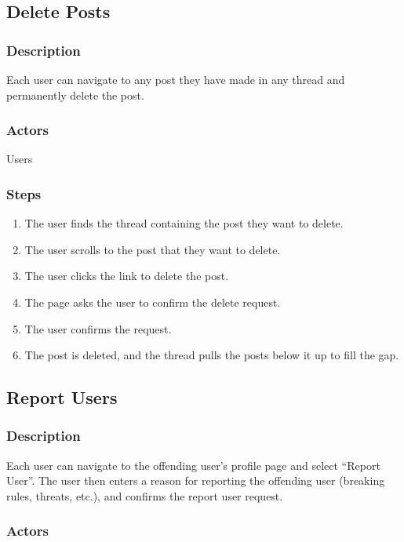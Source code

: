 \documentclass[12pt]{scrartcl}
\begin{document}
\subsection{Delete Posts}
\subsubsection{Description}

Each user can navigate to any post they have made in any thread and permanently delete the post.

\subsubsection{Actors}

Users

\subsubsection{Steps}

\begin{enumerate}
\item The user finds the thread containing the post they want to delete.
\item The user scrolls to the post that they want to delete.
\item The user clicks the link to delete the post.
\item The page asks the user to confirm the delete request.
\item The user confirms the request.
\item The post is deleted, and the thread pulls the posts below it up to fill the gap.
\end{enumerate}



\subsection{Report Users}
\subsubsection{Description}

Each user can navigate to the offending user’s profile page and select “Report User”. The user then enters a reason for reporting the offending user (breaking rules, threats, etc.), and confirms the report user request.

\subsubsection{Actors}
\end{document}
